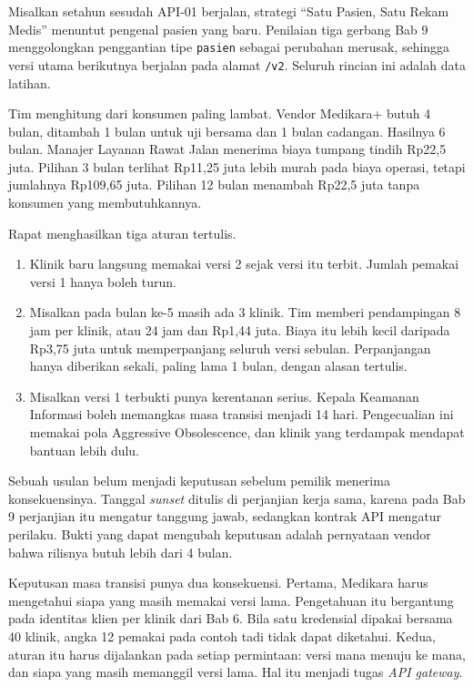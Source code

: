 \begin{kasus}[title={Kasus Medikara Health: Masa Transisi API-01}]
Misalkan setahun sesudah API-01 berjalan, strategi ``Satu Pasien, Satu Rekam Medis'' menuntut pengenal pasien yang baru.
Penilaian tiga gerbang Bab 9 menggolongkan penggantian tipe \texttt{pasien} sebagai perubahan merusak, sehingga versi
utama berikutnya berjalan pada alamat \texttt{/v2}. Seluruh rincian ini adalah data latihan.

Tim menghitung dari konsumen paling lambat. Vendor Medikara+ butuh 4 bulan, ditambah 1 bulan untuk uji bersama dan 1
bulan cadangan. Hasilnya 6 bulan. Manajer Layanan Rawat Jalan menerima biaya tumpang tindih Rp22,5 juta. Pilihan 3 bulan
terlihat Rp11,25 juta lebih murah pada biaya operasi, tetapi jumlahnya Rp109,65 juta. Pilihan 12 bulan menambah Rp22,5
juta tanpa konsumen yang membutuhkannya.

Rapat menghasilkan tiga aturan tertulis.
\begin{enumerate}
  \item Klinik baru langsung memakai versi 2 sejak versi itu terbit. Jumlah pemakai versi 1 hanya boleh turun.
  \item Misalkan pada bulan ke-5 masih ada 3 klinik. Tim memberi pendampingan 8 jam per klinik, atau 24 jam dan Rp1,44
        juta. Biaya itu lebih kecil daripada Rp3,75 juta untuk memperpanjang seluruh versi sebulan. Perpanjangan hanya
        diberikan sekali, paling lama 1 bulan, dengan alasan tertulis.
  \item Misalkan versi 1 terbukti punya kerentanan serius. Kepala Keamanan Informasi boleh memangkas masa transisi
        menjadi 14 hari. Pengecualian ini memakai pola Aggressive Obsolescence, dan klinik yang terdampak mendapat
        bantuan lebih dulu.
\end{enumerate}

Sebuah usulan belum menjadi keputusan sebelum pemilik menerima konsekuensinya. Tanggal \textit{sunset} ditulis di
perjanjian kerja sama, karena pada Bab 9 perjanjian itu mengatur tanggung jawab, sedangkan kontrak API mengatur
perilaku. Bukti yang dapat mengubah keputusan adalah pernyataan vendor bahwa rilisnya butuh lebih dari 4 bulan.
\end{kasus}

Keputusan masa transisi punya dua konsekuensi. Pertama, Medikara harus mengetahui siapa yang masih memakai versi lama.
Pengetahuan itu bergantung pada identitas klien per klinik dari Bab 6. Bila satu kredensial dipakai bersama 40 klinik,
angka 12 pemakai pada contoh tadi tidak dapat diketahui. Kedua, aturan itu harus dijalankan pada setiap permintaan:
versi mana menuju ke mana, dan siapa yang masih memanggil versi lama. Hal itu menjadi tugas \textit{API gateway}.

